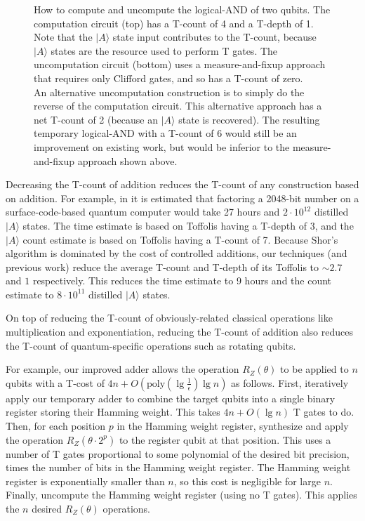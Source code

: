 \documentclass[twocolumn]{revtex4-1}
\begin{document}
\begin{figure}
  
  \caption{
	How to compute and uncompute the logical-AND of two qubits.
	The computation circuit (top) has a T-count of 4 and a T-depth of 1.
	Note that the $|A\rangle$ state input contributes to the T-count, because $|A\rangle$ states are the resource used to perform T gates.
	The uncomputation circuit (bottom) uses a measure-and-fixup approach \cite{Jones2013} that requires only Clifford gates, and so has a T-count of zero.
    \\
    An alternative uncomputation construction is to simply do the reverse of the computation circuit.
    This alternative approach has a net T-count of 2 (because an $|A\rangle$ state is recovered).
    The resulting temporary logical-AND with a T-count of 6 would still be an improvement on existing work, but would be inferior to the measure-and-fixup approach shown above.
  }
  \label{fig:temporary-logical-AND}
\end{figure}

Decreasing the T-count of addition reduces the T-count of any construction based on addition.
For example, in \citep{Fowler2012} it is estimated that factoring a 2048-bit number on a surface-code-based quantum computer would take 27 hours and $2 \cdot 10^{12}$ distilled $|A\rangle$ states.
The time estimate is based on Toffolis having a T-depth of 3, and the $|A\rangle$ count estimate is based on Toffolis having a T-count of 7.
Because Shor's algorithm is dominated by the cost of controlled additions, our techniques (and previous work) reduce the average T-count and T-depth of its Toffolis to $\sim 2.7$ and $1$ respectively.
This reduces the time estimate to 9 hours and the count estimate to $8 \cdot 10^{11}$ distilled $|A\rangle$ states.

On top of reducing the T-count of obviously-related classical operations like multiplication and exponentiation, reducing the T-count of addition also reduces the T-count of quantum-specific operations such as rotating qubits.

For example, our improved adder allows the operation $R_Z(\theta)$ to be applied to $n$ qubits with a T-cost of $4n + O(\text{poly}(\lg \frac{1}{\epsilon}) \lg n)$ as follows.
First, iteratively apply our temporary adder to combine the target qubits into a single binary register storing their Hamming weight.
This takes $4n + O(\lg n)$ T gates to do.
Then, for each position $p$ in the Hamming weight register, synthesize and apply the operation $R_Z(\theta \cdot 2^p)$ to the register qubit at that position.
This uses a number of T gates proportional to some polynomial of the desired bit precision, times the number of bits in the Hamming weight register.
The Hamming weight register is exponentially smaller than $n$, so this cost is negligible for large $n$.
Finally, uncompute the Hamming weight register (using no T gates).
This applies the $n$ desired $R_Z(\theta)$ operations.
\end{document}
